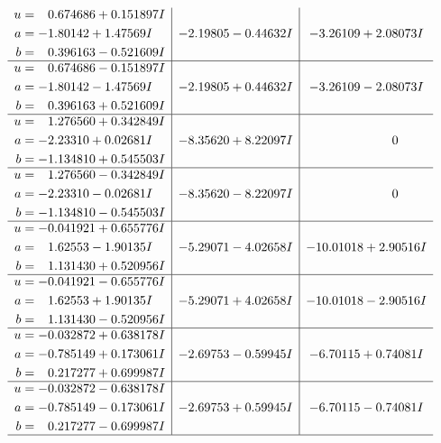 \documentclass[1p]{elsarticle_modified}
\theoremstyle{definition}
\begin{document}
$$\begin{array}{c|c|c}
\begin{aligned}
u &= \phantom{-}0.674686 + 0.151897 I \\
a &= -1.80142 + 1.47569 I \\
b &= \phantom{-}0.396163 - 0.521609 I\end{aligned}
 & -2.19805 - 0.44632 I & -3.26109 + 2.08073 I \\ \hline\begin{aligned}
u &= \phantom{-}0.674686 - 0.151897 I \\
a &= -1.80142 - 1.47569 I \\
b &= \phantom{-}0.396163 + 0.521609 I\end{aligned}
 & -2.19805 + 0.44632 I & -3.26109 - 2.08073 I \\ \hline\begin{aligned}
u &= \phantom{-}1.276560 + 0.342849 I \\
a &= -2.23310 + 0.02681 I \\
b &= -1.134810 + 0.545503 I\end{aligned}
 & -8.35620 + 8.22097 I & \phantom{-0.000000 } 0 \\ \hline\begin{aligned}
u &= \phantom{-}1.276560 - 0.342849 I \\
a &= -2.23310 - 0.02681 I \\
b &= -1.134810 - 0.545503 I\end{aligned}
 & -8.35620 - 8.22097 I & \phantom{-0.000000 } 0 \\ \hline\begin{aligned}
u &= -0.041921 + 0.655776 I \\
a &= \phantom{-}1.62553 - 1.90135 I \\
b &= \phantom{-}1.131430 + 0.520956 I\end{aligned}
 & -5.29071 - 4.02658 I & -10.01018 + 2.90516 I \\ \hline\begin{aligned}
u &= -0.041921 - 0.655776 I \\
a &= \phantom{-}1.62553 + 1.90135 I \\
b &= \phantom{-}1.131430 - 0.520956 I\end{aligned}
 & -5.29071 + 4.02658 I & -10.01018 - 2.90516 I \\ \hline\begin{aligned}
u &= -0.032872 + 0.638178 I \\
a &= -0.785149 + 0.173061 I \\
b &= \phantom{-}0.217277 + 0.699987 I\end{aligned}
 & -2.69753 - 0.59945 I & -6.70115 + 0.74081 I \\ \hline\begin{aligned}
u &= -0.032872 - 0.638178 I \\
a &= -0.785149 - 0.173061 I \\
b &= \phantom{-}0.217277 - 0.699987 I\end{aligned}
 & -2.69753 + 0.59945 I & -6.70115 - 0.74081 I\\
 \hline 
 \end{array}$$\newpage\newpage\renewcommand{\arraystretch}{1}
\end{document}
